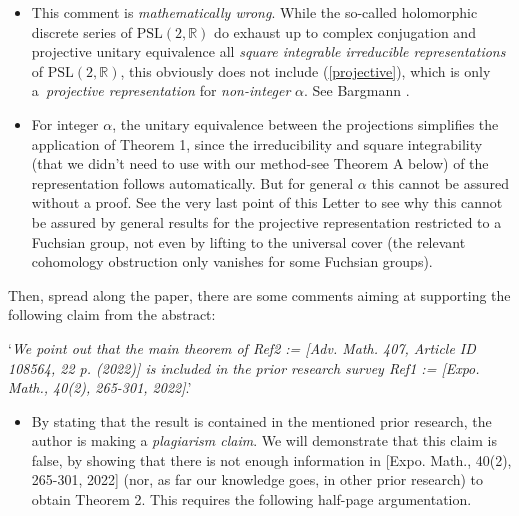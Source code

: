 \documentclass[11pt,reqno]{amsart}
\numberwithin{equation}{section}
\theoremstyle{plain}
\theoremstyle{definition}
\theoremstyle{remark}
\begin{document}
\begin{itemize}
\item This comment is \emph{mathematically wrong}. While the so-called
holomorphic discrete series of $\mathrm{PSL}(2,\mathbb{R})$ do exhaust up to
complex conjugation and projective unitary equivalence all \emph{square
integrable irreducible representations} of $\mathrm{PSL}(2,\mathbb{R})$,
this obviously does not include (\ref{projective}), which is only a\emph{\
projective representation }for \emph{non-integer} $\alpha $. See Bargmann 
\cite[5g, II]{Bar}.

\item For integer $\alpha $, the unitary equivalence between the projections
simplifies the application of Theorem 1, since the irreducibility and square
integrability (that we didn't need to use with our method-see Theorem A
below) of the representation follows automatically. But for general $\alpha $
this cannot be assured without a proof. See the very last point of this
Letter to see why this cannot be assured by general results for the
projective representation restricted to a Fuchsian group, not even by
lifting to the universal cover (the relevant cohomology obstruction only
vanishes for some Fuchsian groups). 
\begin{equation*}
\end{equation*}
\end{itemize}

Then, spread along the paper, there are some comments aiming at supporting
the following claim from the abstract:%
\begin{equation*}
\end{equation*}

`\emph{We point out that the main theorem of Ref2 := [Adv. Math. 407,
Article ID 108564, 22 p. (2022)] is included in the prior research survey
Ref1 := [Expo. Math., 40(2), 265-301, 2022]}.'%
\begin{equation*}
\end{equation*}

\begin{itemize}
\item By stating that the result is contained in the mentioned prior
research, the author is making a \emph{plagiarism claim}. We will
demonstrate that this claim is false, by showing that there is not enough
information in [Expo. Math., 40(2), 265-301, 2022] (nor, as far our
knowledge goes, in other prior research) to obtain Theorem 2. This requires
the following half-page argumentation.
\end{itemize}
\end{document}
